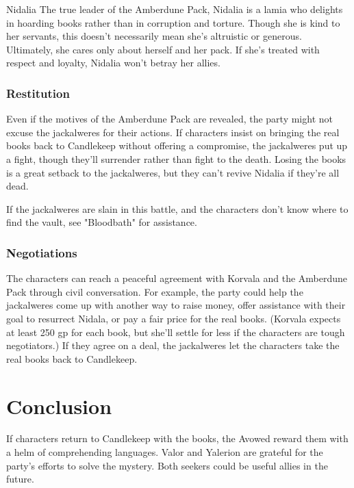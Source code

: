 \documentclass[10pt,a4paper,twoside,bg=print,twocolumn,openany,nodeprecatedcode]{dndbook}
\begin{document}
\begin{DndSidebar}[float=!b]{Nidalia}
The true leader of the Amberdune Pack, Nidalia is a lamia who delights in hoarding books rather than in corruption and torture. Though she is kind to her servants, this doesn't necessarily mean she's altruistic or generous. Ultimately, she cares only about herself and her pack. If she's treated with respect and loyalty, Nidalia won't betray her allies.



\end{DndSidebar}

\subsubsection{Restitution}
Even if the motives of the Amberdune Pack are revealed, the party might not excuse the jackalweres for their actions. If characters insist on bringing the real books back to Candlekeep without offering a compromise, the jackalweres put up a fight, though they'll surrender rather than fight to the death. Losing the books is a great setback to the jackalweres, but they can't revive Nidalia if they're all dead.

If the jackalweres are slain in this battle, and the characters don't know where to find the vault, see "Bloodbath" for assistance.

\subsubsection{Negotiations}
The characters can reach a peaceful agreement with Korvala and the Amberdune Pack through civil conversation. For example, the party could help the jackalweres come up with another way to raise money, offer assistance with their goal to resurrect Nidala, or pay a fair price for the real books. (Korvala expects at least 250 gp for each book, but she'll settle for less if the characters are tough negotiators.) If they agree on a deal, the jackalweres let the characters take the real books back to Candlekeep.

\section{Conclusion}
If characters return to Candlekeep with the books, the Avowed reward them with a helm of comprehending languages. Valor and Yalerion are grateful for the party's efforts to solve the mystery. Both seekers could be useful allies in the future.
\end{document}
